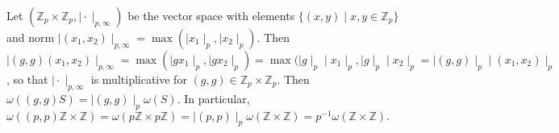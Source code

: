 \begin{example}
	Let $(\mathbb{Z}_p \times \mathbb{Z}_p, \mid \cdot \mid_{p,\infty})$ be the vector space with elements $\{(x,y)\mid x,y \in \mathbb{Z}_p\}$ and norm $ \mid (x_1,x_2) \mid_{p,\infty} = \max(\mid x_1 \mid_p,\mid x_2 \mid_p ).$ Then $\mid (g,g)(x_1,x_2) \mid_{p,\infty} = \max(\mid gx_1 \mid_p,\mid gx_2 \mid_p ) = \max(\mid g \mid_p \mid x_1 \mid_p,\mid g \mid_p \mid x_2 \mid_p=\mid (g,g) \mid_p \mid (x_1,x_2) \mid_p$, so that $\mid \cdot \mid_{p,\infty} $ is multiplicative for $(g,g) \in \mathbb{Z}_p \times \mathbb{Z}_p$. Then $\omega((g,g)S) = \mid (g,g) \mid_p\omega(S)$. In particular, $\omega((p,p)\mathbb{Z} \times \mathbb{Z}) =\omega(p\mathbb{Z} \times p\mathbb{Z})=\mid (p,p) \mid_p \omega(\mathbb{Z} \times \mathbb{Z}) =
	p^{-1} \omega(\mathbb{Z} \times \mathbb{Z}). $
\end{example}

